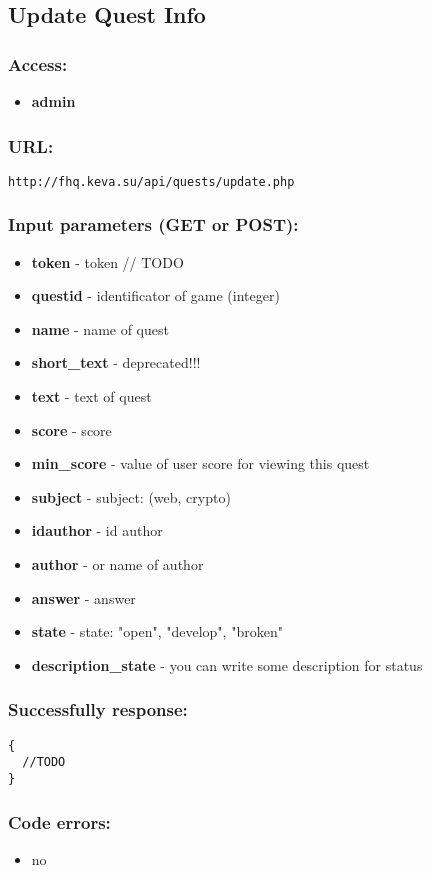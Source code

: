 \subsection{Update Quest Info}
\par

\subsubsection{Access:}
\begin{itemize}
  \item \textbf{admin}
\end{itemize}

\subsubsection{URL:}
\begin{Verbatim}[frame=single]
http://fhq.keva.su/api/quests/update.php
\end{Verbatim}

\subsubsection{Input parameters (GET or POST):}
\begin{itemize}
  \item \textbf{token} - token // TODO
  \item \textbf{questid} - identificator of game (integer)
  \item \textbf{name} - name of quest
  \item \textbf{short\_text} - deprecated!!!
  \item \textbf{text} - text of quest
  \item \textbf{score} - score
  \item \textbf{min\_score} - value of user score for viewing this quest
  \item \textbf{subject} - subject: (web, crypto)
  \item \textbf{idauthor} - id author 
  \item \textbf{author} - or name of author
  \item \textbf{answer} - answer
  \item \textbf{state} - state: "open", "develop", "broken"
  \item \textbf{description\_state} - you can write some description for status
\end{itemize}

\subsubsection{Successfully response:}
\begin{Verbatim}[frame=single]
{
  //TODO
}
\end{Verbatim}

\subsubsection{Code errors:}
\begin{itemize}
	\item no
\end{itemize}

